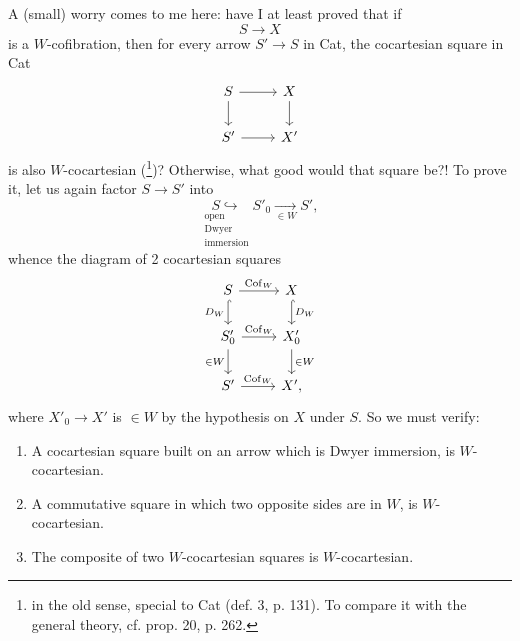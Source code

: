 \documentclass[11pt]{article}
\newcommand{\printedpage}[1]{\marginpar{\footnotesize p.~#1}}
\newcommand{\msp}[1]{\marginpar{\footnotesize [#1]}}
\begin{document}
A (small) worry comes to me here: have I at least proved that if
\[
S \longrightarrow X
\]
is a $W$-cofibration, then for every arrow $S' \longrightarrow S$ in Cat, the cocartesian square in Cat %
\[
\begin{tikzcd}
S \arrow[r] \arrow[d] & X \arrow[d] \\
S' \arrow[r] & X'
\end{tikzcd}
\]
is also $W$-cocartesian (\footnote[126]{in the old sense, special to Cat (def. 3, p. 131). To compare it with the general theory, cf. prop. 20, p. 262.})? Otherwise,
\msp{page 233}
what good would that square be?! To prove it, let us again factor $S \longrightarrow S'$ into
\[
\underset{\substack{\text{open}\\ \text{Dwyer}\\ \text{immersion}}}{S \hookrightarrow} S'_0 \underset{\in W}{\longrightarrow} S',
\]
whence the diagram of 2 cocartesian squares
\[
\begin{tikzcd}
S \arrow[r, "\mathrm{Cof}_W"] \arrow[d, hook, "D_W"'] & X \arrow[d, hook, "D_W"] \\
S'_0 \arrow[r, "\mathrm{Cof}_W"] \arrow[d, "\in W"'] & X'_0 \arrow[d, "\in W"] \\
S' \arrow[r, "\mathrm{Cof}_W"] & X',
\end{tikzcd}
\]
where $X'_0 \longrightarrow X'$ is $\in W$ by the hypothesis on $X$ under $S$. So we must verify:
\printedpage{149}
\begin{enumerate}
\item[a)] A cocartesian square built on an arrow which is Dwyer immersion, is $W$-cocartesian.
\item[b)] A commutative square in which two opposite sides are in $W$, is $W$-cocartesian.
\item[c)] The composite of two $W$-cocartesian squares is $W$-cocartesian.
\end{enumerate}
\end{document}
